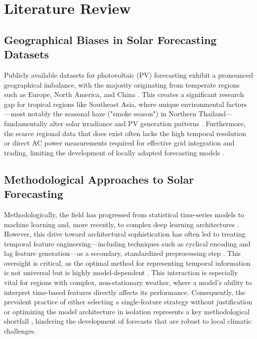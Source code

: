 \documentclass[conference]{IEEEtran}
\begin{document}
	\section{Literature Review}
	
	\subsection{Geographical Biases in Solar Forecasting Datasets}
	Publicly available datasets for photovoltaic (PV) forecasting exhibit a pronounced geographical imbalance, with the majority originating from temperate regions such as Europe, North America, and China \cite{EuropeanDataset2019, NREL2018, ChinaSolar2020}. This creates a significant research gap for tropical regions like Southeast Asia, where unique environmental factors—most notably the seasonal haze ("smoke season") in Northern Thailand—fundamentally alter solar irradiance and PV generation patterns \cite{Amnuaylojaroen2020, ASEANEnergy2022}. Furthermore, the scarce regional data that does exist often lacks the high temporal resolution or direct AC power measurements required for effective grid integration and trading, limiting the development of locally adapted forecasting models \cite{Seng2021, Ahmed2020}.
	
	\subsection{Methodological Approaches to Solar Forecasting}
	Methodologically, the field has progressed from statistical time-series models to machine learning and, more recently, to complex deep learning architectures \cite{LeCun2015, Hochreiter1997}. However, this drive toward architectural sophistication has often led to treating temporal feature engineering—including techniques such as cyclical encoding and lag feature generation—as a secondary, standardized preprocessing step \cite{Cerqueira2020, BoxJenkins1976}. This oversight is critical, as the optimal method for representing temporal information is not universal but is highly model-dependent \cite{Bommes2021}. This interaction is especially vital for regions with complex, non-stationary weather, where a model's ability to interpret time-based features directly affects its performance. Consequently, the prevalent practice of either selecting a single-feature strategy without justification or optimizing the model architecture in isolation represents a key methodological shortfall \cite{Wang2019}, hindering the development of forecasts that are robust to local climatic challenges.
	
\end{document}
